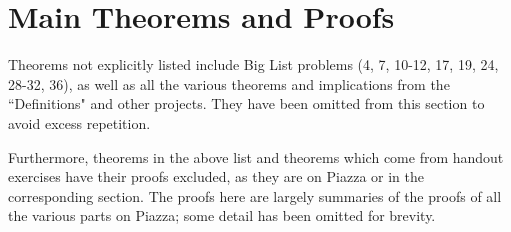\section{Main Theorems and Proofs}
Theorems not explicitly listed include Big List problems (4, 7, 10-12, 17, 19,
24, 28-32, 36), as well as all the various theorems and implications from the
``Definitions" and other projects. They have been omitted from this section to
avoid excess repetition.

Furthermore, theorems in the above list and theorems which come from handout
exercises have their proofs excluded, as they are on Piazza or in the
corresponding section. The proofs here are largely summaries of the proofs of all
the various parts on Piazza; some detail has been omitted for brevity.











\newpage %

